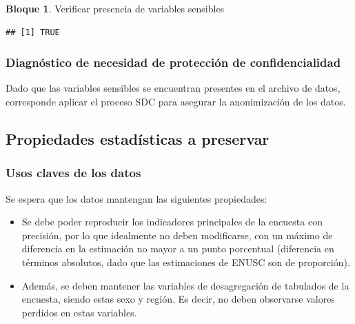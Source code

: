 \documentclass[]{book}
\newenvironment{Shaded}{\begin{snugshade}}{\end{snugshade}}
\newcommand{\KeywordTok}[1]{\textcolor[rgb]{0.13,0.29,0.53}{\textbf{#1}}}
\newcommand{\NormalTok}[1]{#1}
\newcommand{\OperatorTok}[1]{\textcolor[rgb]{0.81,0.36,0.00}{\textbf{#1}}}
\newcommand{\StringTok}[1]{\textcolor[rgb]{0.31,0.60,0.02}{#1}}
\theoremstyle{definition}
\theoremstyle{definition}
\newtheorem{example}{Bloque}[chapter]
\theoremstyle{definition}
\theoremstyle{definition}
\theoremstyle{remark}
\begin{document}
\begin{example}
\protect\hypertarget{exm:bloque8nbm}{}{\label{exm:bloque8nbm} }Verificar presencia de variables sensibles
\end{example}

\begin{Shaded}
\end{Shaded}

\begin{verbatim}
## [1] TRUE
\end{verbatim}

\hypertarget{diagnuxf3stico-de-necesidad-de-protecciuxf3n-de-confidencialidad}{%
\subsubsection{Diagnóstico de necesidad de protección de confidencialidad}\label{diagnuxf3stico-de-necesidad-de-protecciuxf3n-de-confidencialidad}}

Dado que las variables sensibles se encuentran presentes en el archivo de datos, corresponde aplicar el proceso SDC para asegurar la anonimización de los datos.

\hypertarget{propiedades-estaduxedsticas-a-preservar}{%
\subsection{Propiedades estadísticas a preservar}\label{propiedades-estaduxedsticas-a-preservar}}

\hypertarget{usos-claves-de-los-datos}{%
\subsubsection{Usos claves de los datos}\label{usos-claves-de-los-datos}}

Se espera que los datos mantengan las siguientes propiedades:

\begin{itemize}
\item
  Se debe poder reproducir los indicadores principales de la encuesta con precisión, por lo que idealmente no deben modificarse, con un máximo de diferencia en la estimación no mayor a un punto porcentual (diferencia en términos absolutos, dado que las estimaciones de ENUSC son de proporción).
\item
  Además, se deben mantener las variables de desagregación de tabulados de la encuesta, siendo estas sexo y región. Es decir, no deben observarse valores perdidos en estas variables.
\end{itemize}
\end{document}
